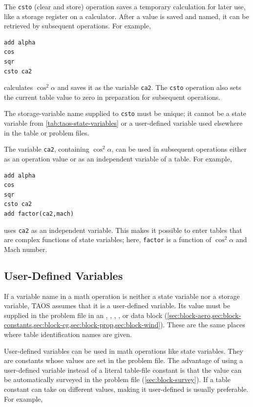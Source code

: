 The \texttt{csto} (clear and store) operation saves a temporary calculation for later
use, like a storage register on a calculator. After a value is saved and named, it can
be retrieved by subsequent operations. For example,

\begin{lstlisting}[style=taosmanual]
add alpha
cos
sqr
csto ca2
\end{lstlisting}

calculates $\cos^2\alpha$ and saves it as the variable \texttt{ca2}. The
\texttt{csto} operation also sets the current table value to zero in preparation for
subsequent operations.

The storage-variable name supplied to \texttt{csto} must be unique; it cannot be a
state variable from \cref{tab:taos-state-variables} or a user-defined variable used
elsewhere in the table or problem files.

The variable \texttt{ca2}, containing $\cos^2\alpha$, can be used in subsequent
operations either as an operation value or as an independent variable of a table. For
example,

\begin{lstlisting}[style=taosmanual]
add alpha
cos
sqr
csto ca2
add factor(ca2,mach)
\end{lstlisting}

uses \texttt{ca2} as an independent variable. This makes it possible to enter tables
that are complex functions of state variables; here, \texttt{factor} is a function of
$\cos^2\alpha$ and Mach number.

\subsection{User-Defined Variables}\label{sec:table-user-defined-variables}

If a variable name in a math operation is neither a state variable nor a storage
variable, TAOS assumes that it is a user-defined variable. Its value must be supplied
in the problem file in an , ,
, , or  data block
(\cref{sec:block-aero,sec:block-constants,sec:block-cg,sec:block-prop,sec:block-wind}).
These are the same places where table identification names are given.

User-defined variables can be used in math operations like state variables. They are
constants whose values are set in the problem file. The advantage of using a
user-defined variable instead of a literal table-file constant is that the value can be
automatically surveyed in the problem file (\cref{sec:block-survey}). If a table
constant can take on different values, making it user-defined is usually preferable.
For example,

